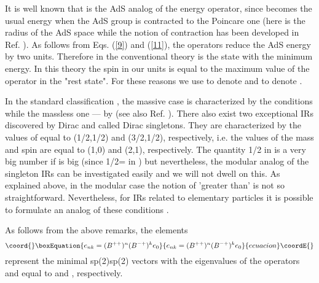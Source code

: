 \documentclass[a4paper,12pt]{article}%
\begin{document}
It is well known that \coordHE{} is the AdS analog of 
the energy operator, since \coordHE{} becomes the usual 
energy when the AdS group is contracted to the Poincare one 
(here \coordHE{} is the radius of the AdS space
while the notion of contraction has been developed in Ref.
\cite{IW}). As follows from 
Eqs. (\ref{9}) and (\ref{11}), the operators \coordHE{} 
reduce the AdS energy by two units. Therefore in the 
conventional theory
\coordHE{} is the state with the minimum energy. In this theory 
the spin in our units is equal to the maximum value of the 
operator \coordHE{} in the
"rest state". For these reasons we use \coordHE{} to denote \coordHE{}
and \coordHE{} to denote \coordHE{}. 

In the standard classification
\cite{Fronsdal, Evans}, the massive case is characterized by
the conditions \coordHE{} while the massless
one --- by \coordHE{} 
(see also Ref. \cite{lev2}). There also exist two exceptional
IRs discovered by Dirac \cite{DiracS} and called Dirac
singletons. They are characterized by the values of \coordHE{}
equal to (1/2,1/2) and (3/2,1/2), respectively, i.e. the 
values of the mass
and spin are equal to (1,0) and (2,1), respectively. 
The quantity
1/2 in \coordHE{} is a very big number if \coordHE{} is big 
(since 1/2=\coordHE{} in \coordHE{}) but nevertheless, the modular
analog of the singleton IRs can be investigated easily \cite{lev1}
and we will not dwell on this. As
explained above, in the modular case the notion of 'greater
than' is not so straightforward. Nevertheless, for IRs
related to elementary particles it is possible to formulate
an analog of these conditions \cite{lev2}. 

As follows from the above remarks, the elements 
\begin{equation}\coord{}\boxEquation{
e_{nk}=(B^{++})^n(B^{-+})^ke_0
\label{15}
}{
e_{nk}=(B^{++})^n(B^{-+})^ke_0
}{ecuacion}\coordE{}\end{equation}
represent the minimal sp(2)\myHighlight{$\times$}\coordHE{}sp(2) vectors with the 
eigenvalues of the operators \coordHE{} and \coordHE{} equal to 
\coordHE{} and \coordHE{}, respectively.
\end{document}
